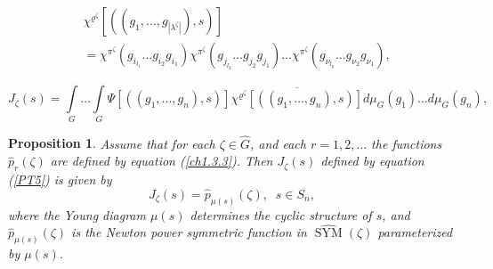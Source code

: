 \documentclass[10pt,a4paper]{amsart}
\newtheorem{prop}{Proposition}
\DeclareMathOperator{\SYM}{SYM}
\begin{document}
\begin{equation}
\begin{split}
&\chi^{\varrho^{\zeta}}\left[\left((g_1,\ldots,g_{|\lambda^{\zeta}|}),s\right)\right]\\
&=\chi^{\pi^{\zeta}}\left(g_{i_{l_1}}\ldots g_{i_2}g_{i_1}\right)
\chi^{\pi^{\zeta}}\left(g_{j_{l_2}}\ldots g_{j_2}g_{j_1}\right)
\ldots \chi^{\pi^{\zeta}}\left(g_{\nu_{l_p}}\ldots g_{\nu_2}g_{\nu_1}\right),
\end{split}
\end{equation}

\begin{equation}\label{PT5}
J_{\zeta}(s)=\int\limits_{G}\ldots\int\limits_{G}
\Psi\left[\left((g_1,\ldots,g_n),s\right)\right]
\overline{\chi^{\varrho^{\zeta}}\left[\left((g_1,\ldots,g_n),s\right)\right]}
d\mu_G(g_1)\ldots d\mu_{G}(g_n),
\end{equation}

\begin{prop}\label{PropPT6}
Assume that for each $\zeta\in\widehat{G}$, and each $r=1,2,\ldots $ the functions $\widehat{p}_r(\zeta)$ are defined by equation (\ref{ch1.3.3}). Then $J_{\zeta}(s)$ defined by equation (\ref{PT5}) is given by
\begin{equation}\label{PT7}
J_{\zeta}(s)=\widehat{p}_{\mu(s)}(\zeta),\;\; s\in S_n,
\end{equation}
where the Young diagram $\mu(s)$ determines the cyclic structure of $s$, and
$\widehat{p}_{\mu(s)}(\zeta)$ is the Newton power symmetric function in $\widehat{\SYM}(\zeta)$
parameterized by $\mu(s)$.
\end{prop}
\end{document}
